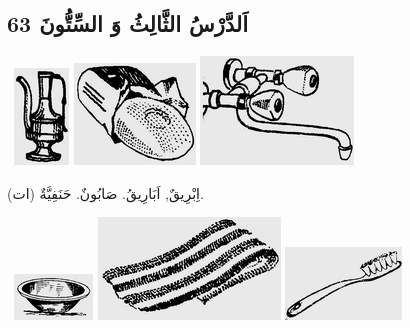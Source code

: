 \documentclass[a5paper]{article}
\begin{document}
\subsection{اَلدَّرْسُ الثَّالِثُ وَ السِّتُّونَ 63}
\  \includegraphics[width=0.5728in,height=1.0102in]{MuhammadBagauddinlatinized-img204.png}   \includegraphics[width=1.2709in,height=1.0626in]{MuhammadBagauddinlatinized-img205.png}   \includegraphics[width=1.6043in,height=1.1354in]{MuhammadBagauddinlatinized-img206.png} 

اِبْرِيقٌ, اَبَارِيقُ. صَابُونٌ. حَنَفِيَّةٌ (ات). 

\  \includegraphics[width=0.8228in,height=0.4791in]{MuhammadBagauddinlatinized-img207.png}   \includegraphics[width=1.9063in,height=1.0728in]{MuhammadBagauddinlatinized-img208.png}   \includegraphics[width=1.2189in,height=0.7602in]{MuhammadBagauddinlatinized-img209.png} 
\end{document}
